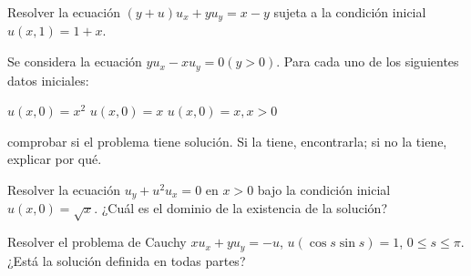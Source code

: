 \begin{problem}[8]
	Resolver la ecuación $(y + u)u_x + yu_y = x - y$ sujeta a la condición inicial $u(x,1) = 1 + x$.

	\solution
\end{problem}

\begin{problem}[9]
	Se considera la ecuación $yu_x - xu_y = 0 (y > 0)$. Para cada uno de los siguientes datos iniciales:

	\ppart $u(x, 0) = x^{2}$
	\ppart $u(x,0) = x$
	\ppart $u(x,0) = x, x > 0$

	comprobar si el problema tiene solución. Si la tiene, encontrarla; si no la tiene, explicar por qué.

	\solution

	\spart
	\spart
	\spart
\end{problem}

\begin{problem}[10]
	Resolver la ecuación $u_y + u^2 u_x = 0$ en $x > 0$ bajo la condición inicial $u(x,0) = \sqrt{x}$. ¿Cuál es el dominio de la existencia de la solución?

	\solution
\end{problem}

\begin{problem}[11]
	Resolver el problema de Cauchy $xu_x + yu_y = -u$, $ u(\cos s \sin s) = 1$, $ 0 \leq s \leq \pi$. ¿Está la solución definida en todas partes?

	\solution
\end{problem}

